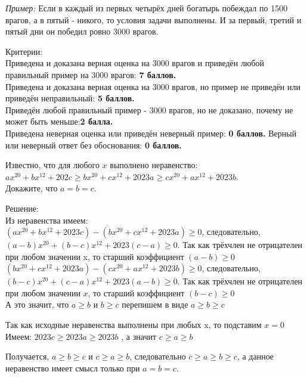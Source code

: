 \textit{Пример:} Если в каждый из первых четырёх дней богатырь побеждал по 1500 врагов, а в пятый - никого, то условия задачи выполнены. И за первый, третий и пятый дни он победил ровно 3000 врагов.

\newpage

\hspace{3mm}

Критерии:\\
Приведена и доказана верная оценка на 3000 врагов и приведён любой правильный пример на 3000 врагов: \textbf{7 баллов.}\\
Приведена и доказана верная оценка на 3000 врагов, но пример не приведён или приведён неправильный: \textbf{5 баллов.}\\
Приведён любой правильный пример - 3000 врагов, но не доказано, почему не может быть меньше:\textbf{2 балла.}\\
Приведена неверная оценка или приведён неверный пример: \textbf{0 баллов.}
Верный или неверный ответ без обоснования: \textbf{0 баллов.} 

\hspace{3mm}

Известно, что для любого $x$ выполнено неравенство:\\ $ax^{20} + bx^{12} + 202c \geq bx^{20} + cx^{12} + 2023a \geq cx^{20} + ax^{12} + 2023b$.\\ Докажите, что $a = b = c.$

\hspace{3mm}

Решение:\\
Из неравенства имеем: \\
$(ax^{20} + bx^{12} + 2023c) - (bx^{20} + cx^{12} + 2023a) \geq 0$, следовательно, $(a-b)x^{20} + (b-c)x^{12} + 2023(c-a) \geq 0.$ Так как трёхчлен не отрицателен при любом значении x, то старший коэффициент $(a-b) \geq 0$\\
$(bx^{20} + cx^{12} + 2023a) - (cx^{20} + ax^{12} + 2023b) \geq 0$, следовательно, $(b-c)x^{20} + (c-a)x^{12} + 2023(a-b) \geq 0.$ Так как трёхчлен не отрицателен при любом значении $x$, то старший коэффициент $(b-c) \geq 0$\\
А это значит, что $a \geq b$ и $b \geq c$ перепишем в виде $a \geq b \geq c$

Так как исходные неравенства выполнены при любых x, то подставим $x = 0$
Имеем:
$2023c \geq 2023a \geq 2023b$ , а значит $c \geq a \geq b$

Получается, $a \geq b \geq c$ и $c \geq a \geq b$, следовательно $c \geq a \geq b \geq c$, а данное неравенство имеет смысл только при $a = b = c.$

